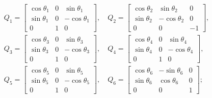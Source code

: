\documentclass[conference]{IEEEtran}
\begin{document}
\begin{small}
    \begin{align*}
         & Q_1 = \begin{bmatrix}
                     \cos \theta_1 & 0 & \sin \theta_1   \\
                     \sin \theta_1 & 0 & - \cos \theta_1 \\
                     0             & 1 & 0
                 \end{bmatrix} , \quad
        Q_2 = \begin{bmatrix}
                  \cos \theta_2 & \sin \theta_2   & 0  \\
                  \sin \theta_2 & - \cos \theta_2 & 0  \\
                  0             & 0               & -1
              \end{bmatrix} ,   \\
         & Q_3 = \begin{bmatrix}
                     \cos \theta_3 & 0 & \sin \theta_3   \\
                     \sin \theta_3 & 0 & - \cos \theta_3 \\
                     0             & 1 & 0
                 \end{bmatrix}, \quad
        Q_4 = \begin{bmatrix}
                  \cos \theta_4 & 0 & \sin \theta_4   \\
                  \sin \theta_4 & 0 & - \cos \theta_4 \\
                  0             & 1 & 0
              \end{bmatrix} ,    \\
         & Q_5 = \begin{bmatrix}
                     \cos \theta_5 & 0 & \sin \theta_5   \\
                     \sin \theta_5 & 0 & - \cos \theta_5 \\
                     0             & 1 & 0
                 \end{bmatrix} , \quad
        Q_6 = \begin{bmatrix}
                  \cos \theta_6 & - \sin \theta_6 & 0 \\
                  \sin \theta_6 & \cos \theta_6   & 0 \\
                  0             & 0               & 1
              \end{bmatrix} ;    \\

\end{align*}
\end{small}
\end{document}
